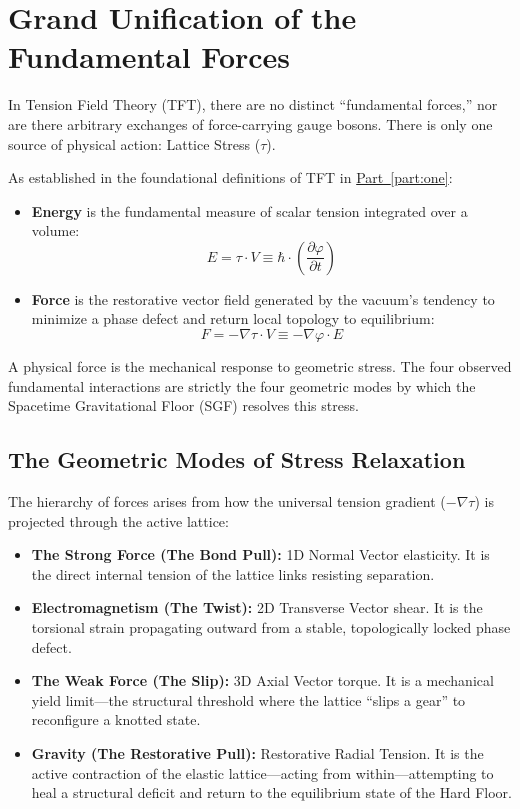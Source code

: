 \chapter{Grand Unification of the Fundamental Forces}
\label{chap:grand_unification}

In Tension Field Theory (TFT), there are no distinct ``fundamental forces,'' nor are there arbitrary exchanges of force-carrying gauge bosons. There is only one source of physical action: Lattice Stress ($\tau$).

As established in the foundational definitions of TFT in \hyperref[part:one]{Part~\ref{part:one}}:
\begin{itemize}
    \item \textbf{Energy} is the fundamental measure of scalar tension integrated over a volume:
    \begin{equation}
        E = \tau \cdot V \equiv \hbar \cdot \left(\frac{\partial \varphi}{\partial t}\right)
    \end{equation}
    \item \textbf{Force} is the restorative vector field generated by the vacuum's tendency to minimize a phase defect and return local topology to equilibrium:
    \begin{equation}
        F = -\nabla\tau \cdot V \equiv -\nabla\varphi \cdot E
    \end{equation}
\end{itemize}

A physical force is the mechanical response to geometric stress. The four observed fundamental interactions are strictly the four geometric modes by which the Spacetime Gravitational Floor (SGF) resolves this stress.

\section{The Geometric Modes of Stress Relaxation}
The hierarchy of forces arises from how the universal tension gradient ($-\nabla\tau$) is projected through the active lattice:
\begin{itemize}
    \item \textbf{The Strong Force (The Bond Pull):} 1D Normal Vector elasticity. It is the direct internal tension of the lattice links resisting separation.
    \item \textbf{Electromagnetism (The Twist):} 2D Transverse Vector shear. It is the torsional strain propagating outward from a stable, topologically locked phase defect.
    \item \textbf{The Weak Force (The Slip):} 3D Axial Vector torque. It is a mechanical yield limit---the structural threshold where the lattice ``slips a gear'' to reconfigure a knotted state.
    \item \textbf{Gravity (The Restorative Pull):} Restorative Radial Tension. It is the active contraction of the elastic lattice---acting from within---attempting to heal a structural deficit and return to the equilibrium state of the Hard Floor.
\end{itemize}

